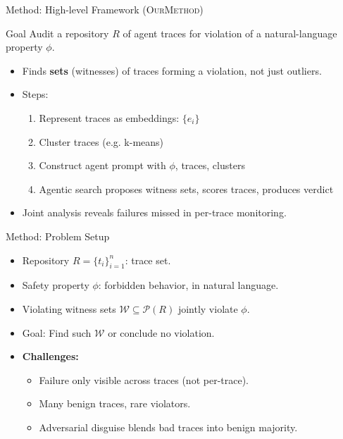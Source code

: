 \documentclass{beamer}
\newcommand{\alertterm}[1]{\alert{#1}}
\begin{document}
\begin{frame}{Method: High-level Framework (\textsc{OurMethod})}
\begin{block}{Goal}
\footnotesize
Audit a \alertterm{repository} $R$ of agent traces for violation of a natural-language property $\phi$.
\end{block}
\begin{itemize}
    \item Finds \textbf{sets} (witnesses) of traces forming a violation, not just outliers.
    \item Steps:
    \begin{enumerate}
        \item Represent traces as embeddings: $\{e_i\}$
        \item \alertterm{Cluster} traces (e.g. k-means)
        \item Construct agent prompt with $\phi$, traces, clusters
        \item \alertterm{Agentic search} proposes witness sets, scores traces, produces verdict
    \end{enumerate}
    \item \alertterm{Joint analysis} reveals failures missed in per-trace monitoring.
\end{itemize}
\end{frame}
\begin{frame}{Method: Problem Setup}
\begin{itemize}
    \item Repository $R = \{ t_i \}_{i=1}^n$: trace set.
    \item Safety property $\phi$: forbidden behavior, in natural language.
    \item \alertterm{Violating witness sets} $\mathcal{W}\subseteq\mathcal{P}(R)$ jointly violate $\phi$.
    \item Goal: Find such $\mathcal{W}$ or conclude no violation.
    \item \textbf{Challenges:}
    \begin{itemize}
        \item Failure only visible \alertterm{across traces} (not per-trace).
        \item Many benign traces, rare violators.
        \item Adversarial disguise blends bad traces into benign majority.
    \end{itemize}
\end{itemize}
\end{frame}
\end{document}
